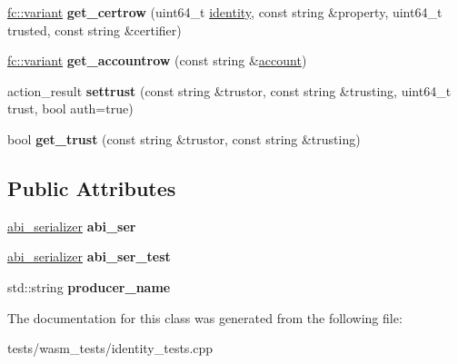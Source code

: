 \begin{DoxyCompactItemize}
\item 
\mbox{\label{classidentity__tester_ab3dee32a0c599c3c826b38c1b2c04f58}} 
\mbox{\hyperlink{classfc_1_1variant}{fc\+::variant}} {\bfseries get\+\_\+certrow} (uint64\+\_\+t \mbox{\hyperlink{structidentity}{identity}}, const string \&property, uint64\+\_\+t trusted, const string \&certifier)
\item 
\mbox{\label{classidentity__tester_a4791cc7acca69e87a22686aa361c4e56}} 
\mbox{\hyperlink{classfc_1_1variant}{fc\+::variant}} {\bfseries get\+\_\+accountrow} (const string \&\mbox{\hyperlink{structaccount}{account}})
\item 
\mbox{\label{classidentity__tester_ada84e4d2636d5b009ccd5d7698079345}} 
action\+\_\+result {\bfseries settrust} (const string \&trustor, const string \&trusting, uint64\+\_\+t trust, bool auth=true)
\item 
\mbox{\label{classidentity__tester_a255f28bdd8d019853b60ce9cd0a2182b}} 
bool {\bfseries get\+\_\+trust} (const string \&trustor, const string \&trusting)
\end{DoxyCompactItemize}
\subsection*{Public Attributes}
\begin{DoxyCompactItemize}
\item 
\mbox{\label{classidentity__tester_ad1fd7c126d2bba7c30b0659234c5d44c}} 
\mbox{\hyperlink{structaacio_1_1chain_1_1contracts_1_1abi__serializer}{abi\+\_\+serializer}} {\bfseries abi\+\_\+ser}
\item 
\mbox{\label{classidentity__tester_afab5692bca6cd4b3c00609aa2c628454}} 
\mbox{\hyperlink{structaacio_1_1chain_1_1contracts_1_1abi__serializer}{abi\+\_\+serializer}} {\bfseries abi\+\_\+ser\+\_\+test}
\item 
\mbox{\label{classidentity__tester_a1bbbc3f38cf56d963e8f32bb4373dd93}} 
std\+::string {\bfseries producer\+\_\+name}
\end{DoxyCompactItemize}


The documentation for this class was generated from the following file\+:\begin{DoxyCompactItemize}
\item 
tests/wasm\+\_\+tests/identity\+\_\+tests.\+cpp\end{DoxyCompactItemize}
